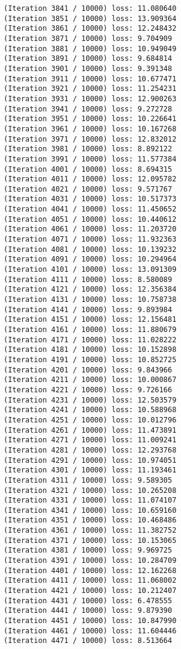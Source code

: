 \documentclass[11pt]{article}
\begin{document}
\begin{Verbatim}[commandchars=\\\{\}]
(Iteration 3841 / 10000) loss: 11.080640
(Iteration 3851 / 10000) loss: 13.909364
(Iteration 3861 / 10000) loss: 12.248432
(Iteration 3871 / 10000) loss: 9.704909
(Iteration 3881 / 10000) loss: 10.949049
(Iteration 3891 / 10000) loss: 9.684814
(Iteration 3901 / 10000) loss: 9.391348
(Iteration 3911 / 10000) loss: 10.677471
(Iteration 3921 / 10000) loss: 11.254231
(Iteration 3931 / 10000) loss: 12.900263
(Iteration 3941 / 10000) loss: 9.272728
(Iteration 3951 / 10000) loss: 10.226641
(Iteration 3961 / 10000) loss: 10.167268
(Iteration 3971 / 10000) loss: 12.832012
(Iteration 3981 / 10000) loss: 8.892122
(Iteration 3991 / 10000) loss: 11.577384
(Iteration 4001 / 10000) loss: 8.694315
(Iteration 4011 / 10000) loss: 12.095782
(Iteration 4021 / 10000) loss: 9.571767
(Iteration 4031 / 10000) loss: 10.517373
(Iteration 4041 / 10000) loss: 11.450652
(Iteration 4051 / 10000) loss: 10.440612
(Iteration 4061 / 10000) loss: 11.203720
(Iteration 4071 / 10000) loss: 11.932363
(Iteration 4081 / 10000) loss: 10.139232
(Iteration 4091 / 10000) loss: 10.294964
(Iteration 4101 / 10000) loss: 13.091309
(Iteration 4111 / 10000) loss: 8.580089
(Iteration 4121 / 10000) loss: 12.356384
(Iteration 4131 / 10000) loss: 10.758738
(Iteration 4141 / 10000) loss: 9.893984
(Iteration 4151 / 10000) loss: 12.156481
(Iteration 4161 / 10000) loss: 11.880679
(Iteration 4171 / 10000) loss: 11.028222
(Iteration 4181 / 10000) loss: 10.152898
(Iteration 4191 / 10000) loss: 10.852725
(Iteration 4201 / 10000) loss: 9.843966
(Iteration 4211 / 10000) loss: 10.000867
(Iteration 4221 / 10000) loss: 9.726166
(Iteration 4231 / 10000) loss: 12.503579
(Iteration 4241 / 10000) loss: 10.588968
(Iteration 4251 / 10000) loss: 10.012796
(Iteration 4261 / 10000) loss: 11.473891
(Iteration 4271 / 10000) loss: 11.009241
(Iteration 4281 / 10000) loss: 12.293768
(Iteration 4291 / 10000) loss: 10.974051
(Iteration 4301 / 10000) loss: 11.193461
(Iteration 4311 / 10000) loss: 9.589305
(Iteration 4321 / 10000) loss: 10.265208
(Iteration 4331 / 10000) loss: 11.074107
(Iteration 4341 / 10000) loss: 10.659160
(Iteration 4351 / 10000) loss: 10.468486
(Iteration 4361 / 10000) loss: 11.382752
(Iteration 4371 / 10000) loss: 10.153065
(Iteration 4381 / 10000) loss: 9.969725
(Iteration 4391 / 10000) loss: 10.284709
(Iteration 4401 / 10000) loss: 12.162268
(Iteration 4411 / 10000) loss: 11.068002
(Iteration 4421 / 10000) loss: 10.212407
(Iteration 4431 / 10000) loss: 6.478555
(Iteration 4441 / 10000) loss: 9.879390
(Iteration 4451 / 10000) loss: 10.847990
(Iteration 4461 / 10000) loss: 11.604446
(Iteration 4471 / 10000) loss: 8.513664

\end{Verbatim}
\end{document}
